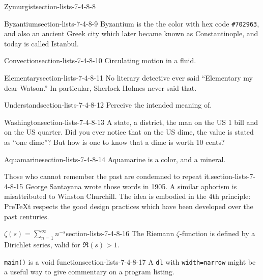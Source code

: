 \documentclass[pdflatex]{sn-jnl}
\theoremstyle{thmstyleone}%
\theoremstyle{thmstyletwo}%
\theoremstyle{thmstylethree}%
\newcommand{\mono}[1]{\texttt{#1}}
\numberwithin{equation}{section}
\begin{document}
\begin{descriptionlist}
\begin{dlinarrow}{Zymurgist}{section-lists-7-4-8-8}
\end{dlinarrow}%
\begin{dlinarrow}{Byzantium}{section-lists-7-4-8-9}%
Byzantium is the the color with hex code \mono{\#702963}, and also an ancient Greek city which later became known as Constantinople, and today is called Istanbul.%
\end{dlinarrow}%
\begin{dlinarrow}{Convection}{section-lists-7-4-8-10}%
Circulating motion in a fluid.%
\end{dlinarrow}%
\begin{dlinarrow}{Elementary}{section-lists-7-4-8-11}%
No literary detective ever said ``Elementary my dear Watson.''  In particular, Sherlock Holmes never said that.%
\end{dlinarrow}%
\begin{dlinarrow}{Understand}{section-lists-7-4-8-12}%
Perceive the intended meaning of.%
\end{dlinarrow}%
\begin{dlinarrow}{Washington}{section-lists-7-4-8-13}%
A state, a district, the man on the US \textdollar{}1 bill and on the US quarter. Did you ever notice that on the US dime, the value is stated as ``one dime''? But how is one to know that a dime is worth 10 cents?%
\end{dlinarrow}%
\begin{dlinarrow}{Aquamarine}{section-lists-7-4-8-14}%
Aquamarine is a color, and a mineral.%
\end{dlinarrow}%
\begin{dlinarrow}{Those who cannot remember the past are condemned to repeat it.}{section-lists-7-4-8-15}%
George Santayana wrote those words in 1905.  A similar aphorism is misattributed to Winston Churchill.  The idea is embodied in the 4th principle: PreTeXt respects the good design practices which have been developed over the past centuries.%
\end{dlinarrow}%
\begin{dlinarrow}{\(\displaystyle \zeta(s) = \sum_{n=1}^\infty n^{-s} \)}{section-lists-7-4-8-16}%
The Riemann \(\zeta\)-function is defined by a Dirichlet series, valid for \(\Re(s) > 1\).%
\end{dlinarrow}%
\begin{dlinarrow}{\mono{main()} is a void function}{section-lists-7-4-8-17}%
A \mono{dl} with \mono{width=\textquotedbl{}narrow\textquotedbl{}} might be a useful way to give commentary on a program listing.%
\end{dlinarrow}%
\end{descriptionlist}
\end{document}
